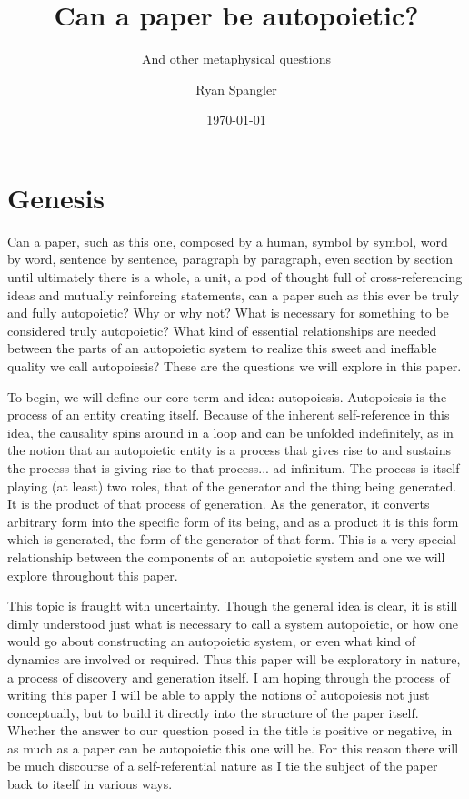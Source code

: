 \documentclass[12pt]{scrartcl}
\title{Can a paper be autopoietic?}
\subtitle{And other metaphysical questions}
\author{Ryan Spangler}
\date{\today}
\begin{document}
\maketitle

\section{Genesis}

Can a paper, such as this one, composed by a human, symbol by symbol, word by word, sentence by sentence, paragraph by paragraph, even section by section until ultimately there is a whole, a unit, a pod of thought full of cross-referencing ideas and mutually reinforcing statements, can a paper such as this ever be truly and fully autopoietic?  Why or why not?  What is necessary for something to be considered truly autopoietic?  What kind of essential relationships are needed between the parts of an autopoietic system to realize this sweet and ineffable quality we call autopoiesis?  These are the questions we will explore in this paper.  

To begin, we will define our core term and idea: autopoiesis.  Autopoiesis is the process of an entity creating itself.  Because of the inherent self-reference in this idea, the causality spins around in a loop and can be unfolded indefinitely, as in the notion that an autopoietic entity is a process that gives rise to and sustains the process that is giving rise to that process... ad infinitum.  The process is itself playing (at least) two roles, that of the generator and the thing being generated.  It is the product of that process of generation.  As the generator, it converts arbitrary form into the specific form of its being, and as a product it is this form which is generated, the form of the generator of that form.  This is a very special relationship between the components of an autopoietic system and one we will explore throughout this paper.  

This topic is fraught with uncertainty.  Though the general idea is clear, it is still dimly understood just what is necessary to call a system autopoietic, or how one would go about constructing an autopoietic system, or even what kind of dynamics are involved or required.  Thus this paper will be exploratory in nature, a process of discovery and generation itself.  I am hoping through the process of writing this paper I will be able to apply the notions of autopoiesis not just conceptually, but to build it directly into the structure of the paper itself.  Whether the answer to our question posed in the title is positive or negative, in as much as a paper can be autopoietic this one will be.  For this reason there will be much discourse of a self-referential nature as I tie the subject of the paper back to itself in various ways.  
\end{document}
